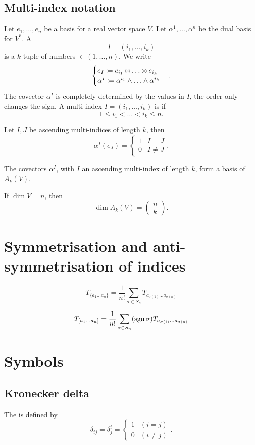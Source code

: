 \subsection{Multi-index notation}
Let $e_1,\ldots, e_n$ be a basis for a real vector space $V$. Let $\alpha^1,\ldots, \alpha^n$ be the dual basis for $V^*$. A 
\[ I = (i_1,\ldots,i_k)\]
is a $k$-tuple of numbers $\in (1,\ldots,n)$. We write
\[ \begin{cases}
e_I \coloneqq e_{i_1}\otimes\ldots\otimes e_{i_k}\\
\alpha^I \coloneqq \alpha^{i_1}\wedge\ldots \wedge\alpha^{i_k}
\end{cases}. \]
The covector $\alpha^I$ is completely determined by the values in $I$, the order only changes the sign. A multi-index $I = (i_1,\ldots,i_k)$ is  if
\[ 1\leq i_1<\ldots<i_k\leq n. \]
\begin{proposition}
Let $I,J$ be ascending multi-indices of length $k$, then
\[ \alpha^I(e_J) = \begin{cases}
1 & I=J \\ 0& I\neq J
\end{cases}. \]
\end{proposition}
\begin{proposition}
The covectors $\alpha^I$, with $I$ an ascending multi-index of length $k$, form a basis of $A_k(V)$.
\end{proposition}
\begin{corollary}
If $\dim V=n$, then
\[ \dim A_k(V) = \begin{pmatrix}
n\\k
\end{pmatrix}. \]
\end{corollary}

\section{Symmetrisation and anti-symmetrisation of indices}

\[ T_{\{a_1\dots a_n\}} = \frac{1}{n!} \sum_{\sigma\in S_n} T_{a_{\sigma(1)} \dots a_{\sigma(n)}} \]

\[ T_{[a_1\dots a_n]} = \frac{1}{n!} \sum_{\sigma\in S_n} (\operatorname{sgn} \sigma)T_{a_{\sigma(1)} \dots a_{\sigma(n)}} \]
\section{Symbols}
\subsection{Kronecker delta}
\begin{definition}
The  is defined by
\[ \delta_{ij} = \delta^i_j = \begin{cases}
1 & (i=j) \\
0 & (i \neq j)
\end{cases}.\]
\end{definition}
